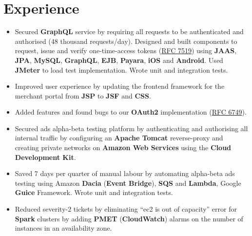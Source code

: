 \section{Experience}

\begin{itemize}[leftmargin=*]
    \item {
        Secured \textbf{GraphQL} service by requiring all requests to be authenticated and authorised (48 thousand requests/day). Designed and built components to request, issue and verify one-time-access tokens (\href{https://datatracker.ietf.org/doc/html/rfc7519}{RFC 7519}) using \textbf{JAAS}, \textbf{JPA}, \textbf{MySQL}, \textbf{GraphQL}, \textbf{EJB}, \textbf{Payara}, \textbf{iOS} and \textbf{Android}. Used \textbf{JMeter} to load test implementation. Wrote unit and integration tests.
    }
    \item {
        Improved user experience by updating the frontend framework for the merchant portal from \textbf{JSP} to \textbf{JSF} and \textbf{CSS}.
    }
    \item {
        Added features and found bugs to our \textbf{OAuth2} implementation (\href{https://datatracker.ietf.org/doc/html/rfc6749}{RFC 6749}).
    }
\end{itemize}


\begin{itemize}[leftmargin=*]
    \item {
        Secured ads alpha-beta testing platform by authenticating and authorising all internal traffic by configuring an \textbf{Apache Tomcat} reverse-proxy and creating private networks on \textbf{Amazon Web Services} using the \textbf{Cloud Development Kit}.
    }
    \item {
        Saved 7 days per quarter of manual labour by automating alpha-beta ads testing using Amazon \textbf{Dacia} (\textbf{Event Bridge}), \textbf{SQS} and \textbf{Lambda}, Google \textbf{Guice} Framework. Wrote unit and integration tests.
    }
    \item {
        Reduced severity-2 tickets by eliminating “ec2 is out of capacity” error for \textbf{Spark} clusters by adding \textbf{PMET} (\textbf{CloudWatch}) alarms on the number of instances in an availability zone.
    }
\end{itemize}

